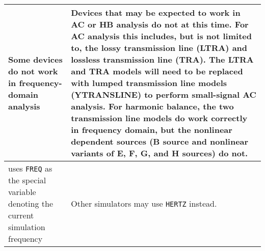 \begin{longtable}[h] {>{\raggedright\small}m{2in}|>{\raggedright\let\\\tabularnewline\small}m{3.5in}}
    Some devices do not work in frequency-domain analysis & Devices
    that may be expected to work in AC or HB analysis do not at this
    time.  For AC analysis this includes, but is not limited to, the
    lossy transmission line (LTRA) and lossless transmission line
    (TRA).  The LTRA and TRA models will need to be replaced with
    lumped transmission line models (YTRANSLINE) to perform
    small-signal AC analysis.  For harmonic balance, the two
    transmission line models do work correctly in frequency domain,
    but the nonlinear dependent sources (B source and nonlinear
    variants of E, F, G, and H sources) do not. \\ \hline

    \Xyce{} uses \texttt{FREQ} as the special variable denoting the
    current simulation frequency  & Other simulators may use \texttt{HERTZ}
    instead. \\ \hline

\end{longtable}

